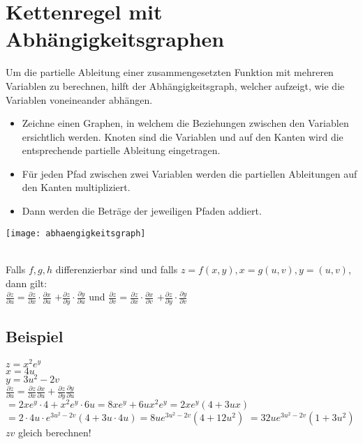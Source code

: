 \documentclass[../main.tex]{subfiles}
\begin{document}
\section{Kettenregel mit Abhängigkeitsgraphen}
Um die partielle Ableitung einer zusammengesetzten Funktion mit mehreren Variablen zu berechnen, 
hilft der Abhängigkeitsgraph, welcher aufzeigt, wie die Variablen voneineander abhängen. \\
\begin{minipage}{0.45\textwidth}
    \begin{itemize}
        \item Zeichne einen Graphen, in welchem die Beziehungen zwischen den Variablen ersichtlich werden.
        Knoten sind die Variablen und auf den Kanten wird die entsprechende partielle Ableitung eingetragen.
        \item Für jeden Pfad zwischen zwei Variablen werden die partiellen Ableitungen auf den Kanten multipliziert.
        \item Dann werden die Beträge der jeweiligen Pfaden addiert.
    \end{itemize}
\end{minipage} \hfill
\begin{minipage}{0.5\textwidth}
    \texttt{[image: abhaengigkeitsgraph]}
\end{minipage}
\\ [7pt]
Falls $f,g,h$ differenzierbar sind und falls $z=f(x,y),x=g(u,v),y=(u,v)$, dann gilt: \\ [7pt]
$\frac{\partial z}{\partial u} = \frac{\partial z}{\partial x} \cdot \frac{\partial x}{\partial u}$
$+ \frac{\partial z}{\partial y} \cdot \frac{\partial y}{\partial u}$ und
$\frac{\partial z}{\partial v} = \frac{\partial z}{\partial x} \cdot \frac{\partial x}{\partial v}$
$+ \frac{\partial z}{\partial y} \cdot \frac{\partial y}{\partial v}$

\subsection{Beispiel}
$z=x^2e^y$ \\
$x=4u$ \\
$y=3u^2-2v$ \\ [7pt]
$\frac{\partial z}{\partial u} = \frac{\partial z}{\partial x}\frac{\partial x}{\partial u}+\frac{\partial z}{\partial y}\frac{\partial y}{\partial u}$ \\[7pt]
$=2xe^y\cdot 4 + x^2e^y\cdot 6u = 8xe^y+6ux^2e^y=2xe^y(4+3ux)$
$=2\cdot 4u \cdot e^{3u^2-2v}(4+3u\cdot 4u)=8ue^{3u^2-2v}(4+12u^2)$
$=32ue^{3u^2-2v}(1+3u^2)$ \\ [7pt]
$zv$ gleich berechnen!
\end{document}

